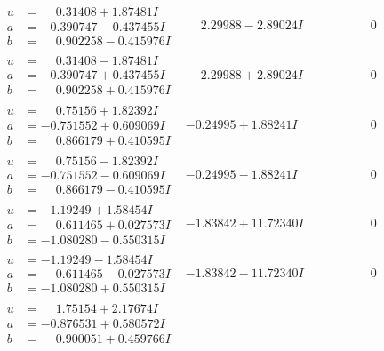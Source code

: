 \documentclass[1p]{elsarticle_modified}
\theoremstyle{definition}
\begin{document}
$$\begin{array}{c|c|c}
\begin{aligned}
u &= \phantom{-}0.31408 + 1.87481 I \\
a &= -0.390747 - 0.437455 I \\
b &= \phantom{-}0.902258 - 0.415976 I\end{aligned}
 & \phantom{-}2.29988 - 2.89024 I & \phantom{-0.000000 } 0 \\ \hline\begin{aligned}
u &= \phantom{-}0.31408 - 1.87481 I \\
a &= -0.390747 + 0.437455 I \\
b &= \phantom{-}0.902258 + 0.415976 I\end{aligned}
 & \phantom{-}2.29988 + 2.89024 I & \phantom{-0.000000 } 0 \\ \hline\begin{aligned}
u &= \phantom{-}0.75156 + 1.82392 I \\
a &= -0.751552 + 0.609069 I \\
b &= \phantom{-}0.866179 + 0.410595 I\end{aligned}
 & -0.24995 + 1.88241 I & \phantom{-0.000000 } 0 \\ \hline\begin{aligned}
u &= \phantom{-}0.75156 - 1.82392 I \\
a &= -0.751552 - 0.609069 I \\
b &= \phantom{-}0.866179 - 0.410595 I\end{aligned}
 & -0.24995 - 1.88241 I & \phantom{-0.000000 } 0 \\ \hline\begin{aligned}
u &= -1.19249 + 1.58454 I \\
a &= \phantom{-}0.611465 + 0.027573 I \\
b &= -1.080280 - 0.550315 I\end{aligned}
 & -1.83842 + 11.72340 I & \phantom{-0.000000 } 0 \\ \hline\begin{aligned}
u &= -1.19249 - 1.58454 I \\
a &= \phantom{-}0.611465 - 0.027573 I \\
b &= -1.080280 + 0.550315 I\end{aligned}
 & -1.83842 - 11.72340 I & \phantom{-0.000000 } 0 \\ \hline\begin{aligned}
u &= \phantom{-}1.75154 + 2.17674 I \\
a &= -0.876531 + 0.580572 I \\
b &= \phantom{-}0.900051 + 0.459766 I\end{aligned}

\end{array}$$
\end{document}
